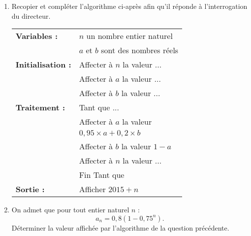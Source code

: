 \begin{enumerate}
     \item
     Recopier et compléter l'algorithme ci-après afin qu'il réponde à l'interrogation du directeur.
     \par
     \begin{center}
          \begin{extern}%
               \begin{tabular}{|l l|}\hline
                    \textbf{Variables :}	& 	$n$ un nombre entier naturel \\
                    &$a$ et $b$ sont des nombres réels\\
                    \textbf{Initialisation :}	& Affecter à $n$ la valeur ...\\
                    & Affecter à $a$ la valeur ...\\
                    & Affecter à $b$ la valeur ...\\
                    \textbf{Traitement :} & Tant que ...\\
                    &\qquad Affecter à $a$ la valeur \\
                    &\qquad \phantom{Affecter }$0,95 \times a + 0,2 \times b$\\
                    &\qquad Affecter à $b$ la valeur $1-a$ \\
                    &\qquad Affecter à $n$ la valeur ...\\
                    &Fin Tant que\\
                    \textbf{Sortie :}		&Afficher $2015+n$ \\ \hline
               \end{tabular}
          \end{extern}
     \end{center}
     \item
     On admet que pour tout entier naturel $n$ :
     \[ a_{n}=0,8(1-0,75^n). \]
     Déterminer la valeur affichée par l'algorithme de la question précédente.
     \par
\end{enumerate}
